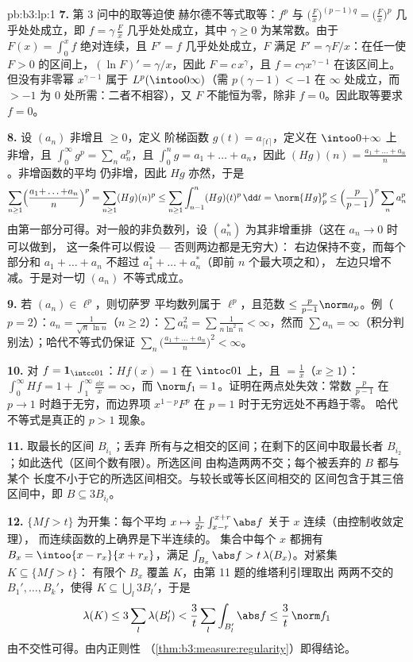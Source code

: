 \begin{solution}{pb:b3:lp:1}
\textbf{7.} 第 3 问中的取等迫使
赫尔德不等式取等：$f^p$ 与 $\bigl(\frac Fx\bigr)^{(p-1)q}
= \bigl(\frac Fx\bigr)^p$ 几乎处处成立，即 $f = \gamma\,\frac Fx$
几乎处处成立，其中 $\gamma \geq 0$ 为某常数。由于 $F(x) = \int_0^xf$
绝对连续，且 $F' = f$ 几乎处处成立，$F$ 满足 $F' =
\gamma F/x$：在任一使 $F > 0$ 的区间上，$(\ln F)' =
\gamma/x$，因此 $F = c\,x^{\gamma}$，且 $f = c\gamma
x^{\gamma - 1}$ 在该区间上。但没有非零幂 $x^{\gamma-1}$
属于 $L^p(\intoo0\infty)$（需 $p(\gamma - 1) < -1$
在 $\infty$ 处成立，而 $> -1$ 为 $0$ 处所需：二者不相容），又 $F$
不能恒为零，除非 $f = 0$。因此取等要求 $f =
0$。

\textbf{8.} 设 $(a_n)$ 非增且 $\geq 0$，定义
阶梯函数 $g(t) = a_{\lceil t\rceil}$，定义在
$\intoo0{+\infty}$ 上非增，且 $\int_0^\infty g^p =
\sum_na_n^p$，且 $\int_0^ng = a_1 + \dots + a_n$，因此
$(Hg)(n) = \frac{a_1 + \dots + a_n}n$。非增函数的平均
仍非增，因此 $Hg$ 亦然，于是
\[
\sum_{n\geq1}\Bigl(\frac{a_1{+}\dots{+}a_n}n\Bigr)^p
= \sum_{n\geq1}(Hg)(n)^p
\leq \sum_{n\geq1}\int_{n-1}^n (Hg)(t)^p\,\dd t
= \norm{Hg}_p^p
\leq \Bigl(\frac p{p-1}\Bigr)^p\sum_n a_n^p
\]
由第一部分可得。对一般的非负数列，设 $(a_n^*)$
为其非增重排（这在 $a_n \to 0$ 时可以做到，
这一条件可以假设 --- 否则两边都是无穷大）：
右边保持不变，而每个部分和 $a_1 + \dots
+ a_n$ 不超过 $a_1^* + \dots + a_n^*$（即前 $n$ 个最大项之和），
左边只增不减。于是对一切
$(a_n)$ 不等式成立。

\textbf{9.} 若 $(a_n) \in \ell^p$，则切萨罗
平均数列属于 $\ell^p$，且范数 $\leq \frac p{p-1}\norm
a_p$。例（$p = 2$）：$a_n = \frac1{\sqrt n\,\ln n}$（$n
\geq 2$）：$\sum a_n^2 = \sum\frac1{n\ln^2n} < \infty$，然而
$\sum a_n = \infty$（积分判别法）；哈代不等式仍保证
$\sum_n\bigl(\frac{a_1 + \dots + a_n}n\bigr)^2 < \infty$。

\textbf{10.} 对 $f = \mathbf 1_{\intcc01}$：$Hf(x) = 1$ 在
$\intoc01$ 上，且 $= \frac1x$（$x \geq 1$）：$\int_0^\infty Hf =
1 + \int_1^\infty\frac{\dd x}x = \infty$，而 $\norm f_1 =
1$。证明在两点处失效：常数
$\frac p{p-1}$ 在 $p \to 1$ 时趋于无穷，而边界项
$x^{1-p}F^p$ 在 $p = 1$ 时于无穷远处不再趋于零。
哈代不等式是真正的 $p > 1$ 现象。

\textbf{11.} 取最长的区间 $B_{i_1}$；丢弃
所有与之相交的区间；在剩下的区间中取最长者
$B_{i_2}$；如此迭代（区间个数有限）。所选区间
由构造两两不交；每个被丢弃的 $B$ 都与某个
长度不小于它的所选区间相交。与较长或等长区间相交的
区间包含于其三倍区间中，即 $B \subseteq
3B_{i_l}$。

\textbf{12.} $\{Mf > t\}$ 为开集：每个平均 $x \mapsto
\frac1{2r}\int_{x-r}^{x+r}\abs f$ 关于 $x$ 连续（由控制收敛定理），
而连续函数的上确界是下半连续的。
集合中每个 $x$ 都拥有 $B_x =
\intoo{x-r_x}{x+r_x}$，满足 $\int_{B_x}\abs f >
t\,\lambda(B_x)$。对紧集 $K \subseteq \{Mf > t\}$：
有限个 $B_x$ 覆盖 $K$，由第 11 题的维塔利引理取出
两两不交的 $B_1', \dots, B_k'$，使得 $K \subseteq
\bigcup_l3B_l'$，于是
\[
\lambda(K) \leq 3\sum_l\lambda(B_l') <
\frac3t\sum_l\int_{B_l'}\abs f \leq \frac3t\,\norm f_1
\]
由不交性可得。由内正则性
（\cref{thm:b3:measure:regularity}）即得结论。


\end{solution}
